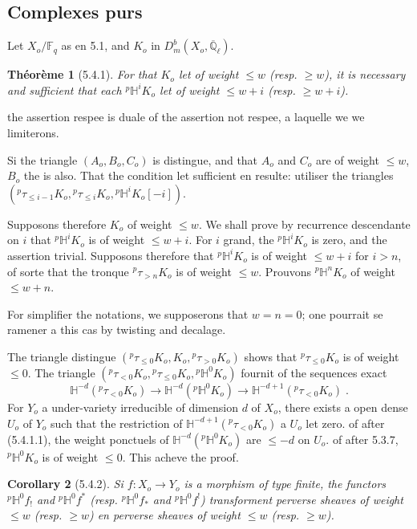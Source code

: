 \documentclass[12pt,a4paper]{article}
\theoremstyle{plain}
\newtheorem{theorem}{Th\'eor\`eme}[section]
\newtheorem{corollary}[theorem]{Corollary}
\theoremstyle{definition}
\theoremstyle{remark}
\newcommand{\FF}{\mathbb{F}}
\newcommand{\HH}{\mathbb{H}}
\newcommand{\QQ}{\mathbb{Q}}
\begin{document}
\subsection{Complexes purs}

Let $X_o/\FF_q$ as en 5.1, and $K_o$ in $D^b_m(X_o, \overline{\QQ}_{\ell})$.

\begin{theorem}[5.4.1]
For that $K_o$ let of weight $\leq w$ (resp. $\geq w$), it is necessary and sufficient that each ${}^{p}\HH^iK_o$ let of weight $\leq w+i$ (resp. $\geq w+i$).
\end{theorem}

the assertion respee is duale of the assertion not respee, a laquelle we we limiterons.

Si the triangle $(A_o, B_o, C_o)$ is distingue, and that $A_o$ and $C_o$ are of weight $\leq w$, $B_o$ the is also. That the condition let sufficient en resulte: utiliser the triangles $({}^{p}\tau_{\leq i-1}K_o, {}^{p}\tau_{\leq i}K_o, {}^{p}\HH^iK_o[-i])$.

Supposons therefore $K_o$ of weight $\leq w$. We shall prove by recurrence descendante on $i$ that ${}^{p}\HH^iK_o$ is of weight $\leq w+i$. For $i$ grand, the ${}^{p}\HH^iK_o$ is zero, and the assertion trivial. Supposons therefore that ${}^{p}\HH^iK_o$ is of weight $\leq w+i$ for $i > n$, of sorte that the tronque ${}^{p}\tau_{>n}K_o$ is of weight $\leq w$. Prouvons ${}^{p}\HH^nK_o$ of weight $\leq w+n$.

For simplifier the notations, we supposerons that $w = n = 0$; one pourrait se ramener a this cas by twisting and decalage.

The triangle distingue $({}^{p}\tau_{\leq 0}K_o, K_o, {}^{p}\tau_{>0}K_o)$ shows that ${}^{p}\tau_{\leq 0}K_o$ is of weight $\leq 0$. The triangle $({}^{p}\tau_{<0}K_o, {}^{p}\tau_{\leq 0}K_o, {}^{p}\HH^0K_o)$ fournit of the sequences exact
\begin{equation}\label{eq:5.4.1.1}
\HH^{-d}({}^{p}\tau_{<0}K_o) \to \HH^{-d}({}^{p}\HH^0K_o) \to \HH^{-d+1}({}^{p}\tau_{<0}K_o)\;.
\end{equation}
For $Y_o$ a under-variety irreducible of dimension $d$ of $X_o$, there exists a open dense $U_o$ of $Y_o$ such that the restriction of $\HH^{-d+1}({}^{p}\tau_{<0}K_o)$ a $U_o$ let zero. of after (5.4.1.1), the weight ponctuels of $\HH^{-d}({}^{p}\HH^0K_o)$ are $\leq -d$ on $U_o$. of after 5.3.7, ${}^{p}\HH^0K_o$ is of weight $\leq 0$. This acheve the proof.

\begin{corollary}[5.4.2]
Si $f: X_o \to Y_o$ is a morphism of type finite, the functors ${}^{p}\HH^0f_!$ and ${}^{p}\HH^0f^*$ (resp. ${}^{p}\HH^0f_*$ and ${}^{p}\HH^0f^!$) transforment perverse sheaves of weight $\leq w$ (resp. $\geq w$) en perverse sheaves of weight $\leq w$ (resp. $\geq w$).
\end{corollary}
\end{document}
